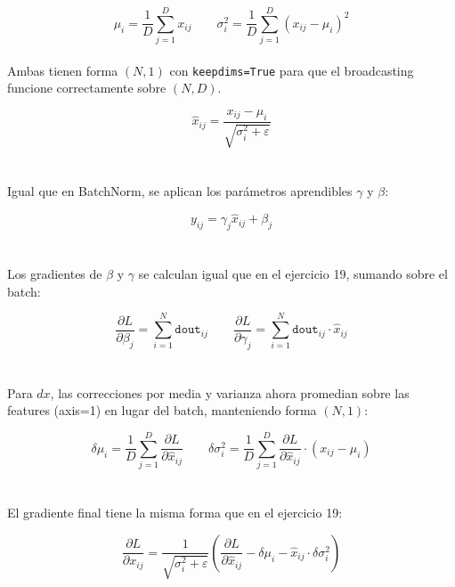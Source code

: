 \documentclass[12pt, letterpaper]{article}
\begin{document}
\[
\mu_i = \frac{1}{D} \sum_{j=1}^{D} x_{ij} \qquad
\sigma^2_i = \frac{1}{D} \sum_{j=1}^{D} (x_{ij} - \mu_i)^2
\] \\

Ambas tienen forma $(N, 1)$ con \texttt{keepdims=True} para que el broadcasting funcione correctamente sobre $(N, D)$.

\[
\hat{x}_{ij} = \frac{x_{ij} - \mu_i}{\sqrt{\sigma^2_i + \varepsilon}}
\] \\ \\ 

Igual que en BatchNorm, se aplican los parámetros aprendibles $\gamma$ y $\beta$:

\[
y_{ij} = \gamma_j \hat{x}_{ij} + \beta_j
\] \\ \\ 


Los gradientes de $\beta$ y $\gamma$ se calculan igual que en el ejercicio 19, sumando sobre el batch:

\[
\frac{\partial L}{\partial \beta_j} = \sum_{i=1}^{N} \texttt{dout}_{ij} \qquad
\frac{\partial L}{\partial \gamma_j} = \sum_{i=1}^{N} \texttt{dout}_{ij} \cdot \hat{x}_{ij}
\] \\ \\ 

Para $dx$, las correcciones por media y varianza ahora promedian sobre las features (axis=1) en lugar del batch, manteniendo forma $(N,1)$:

\[
\delta\mu_i = \frac{1}{D}\sum_{j=1}^{D} \frac{\partial L}{\partial \hat{x}_{ij}}
\qquad
\delta\sigma^2_i = \frac{1}{D}\sum_{j=1}^{D} \frac{\partial L}{\partial \hat{x}_{ij}} \cdot (x_{ij} - \mu_i)
\] \\ \\

El gradiente final tiene la misma forma que en el ejercicio 19:

\[
\frac{\partial L}{\partial x_{ij}} = \frac{1}{\sqrt{\sigma^2_i + \varepsilon}} \left( \frac{\partial L}{\partial \hat{x}_{ij}} - \delta\mu_i - \hat{x}_{ij} \cdot \delta\sigma^2_i \right)
\]
\end{document}
